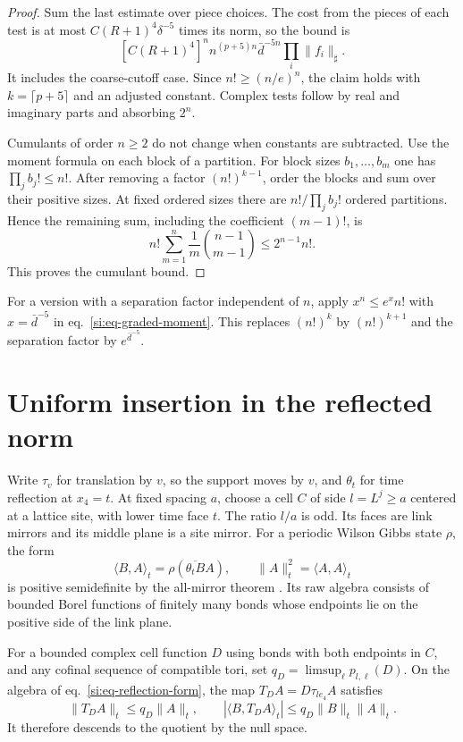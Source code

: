 \documentclass[11pt,letterpaper,reqno]{amsart}
\makeatletter
\numberwithin{equation}{section}
\renewcommand{\eqref}[1]{\textup{eq.~\ref{#1}}}
\theoremstyle{definition}
\newcommand{\ms@minorstart}{%
  \pushQED{\qed}\renewcommand{\qedsymbol}{$\blacksquare$}}
\newenvironment{lemma}[1][]{\ms@minorstart\ms@lemma[#1]}
  {\popQED\endms@lemma}
\theoremstyle{remark}
\makeatother
\begin{document}
\begin{proof}
Sum the last estimate over piece choices. The cost from the
pieces of each test is at most $C(R+1)^4\delta^{-5}$ times
its norm, so the bound is
\[
   [C(R+1)^4]^n n^{(p+5)n}\bar d^{-5n}\prod_i\|f_i\|_\sharp .
\]
It includes the coarse-cutoff case. Since $n!\ge(n/e)^n$, the
claim holds with $k=\lceil p+5\rceil$ and an adjusted constant.
Complex tests follow by real and imaginary parts and absorbing
$2^n$.

Cumulants of order $n\ge2$ do not change when constants are
subtracted. Use the moment formula on each block of a partition.
For block sizes $b_1,\ldots,b_m$ one has $\prod_j b_j!\le n!$.
After removing a factor $(n!)^{k-1}$, order the blocks and
sum over their positive sizes. At fixed ordered sizes there
are $n!/\prod_j b_j!$ ordered partitions. Hence the remaining
sum, including the coefficient $(m-1)!$, is
\[
    n!\sum_{m=1}^n \frac1m \binom{n-1}{m-1}\le 2^{n-1}n!.
\]
This proves the cumulant bound.
\end{proof}

For a version with a separation factor independent of $n$,
apply $x^n\le e^x n!$ with $x=\bar d^{-5}$ in
\eqref{si:eq-graded-moment}. This replaces $(n!)^k$ by
$(n!)^{k+1}$ and the separation factor by $e^{\bar d^{-5}}$.


\section{Uniform insertion in the reflected norm}
\label{si:sec-insertion}

Write $\tau_v$ for translation by $v$, so the support moves by
$v$, and $\theta_t$ for time reflection at $x_4=t$. At fixed
spacing $a$, choose a cell $C$ of side $l=L^j\ge a$ centered at
a lattice site, with lower time face $t$. The ratio $l/a$ is
odd. Its faces are link mirrors and its middle plane is a site
mirror. For a periodic Wilson Gibbs state $\rho$, the form
\begin{equation}\label{si:eq-reflection-form}
  \langle B,A\rangle_t=\rho(\overline{\theta_t B}A),
  \qquad \|A\|_t^2=\langle A,A\rangle_t
\end{equation}
is positive semidefinite by the all-mirror theorem
\cite[Theorem~B]{LP}. Its raw algebra consists of bounded
Borel functions of finitely many bonds whose endpoints lie
on the positive side of the link plane.

\begin{samepage}
\begin{lemma}[Cell multiplication and a time shift]
\label{si:lem-reflected-cell-operator}
For a bounded complex cell function $D$ using bonds with both
endpoints in $C$, and any cofinal sequence of compatible tori,
set $q_D=\limsup_{\ell}p_{l,\ell}(D)$. On the algebra of
\eqref{si:eq-reflection-form}, the map $T_D A=D\tau_{le_4}A$
satisfies
\begin{equation}\label{si:eq-cell-operator}
 \|T_D A\|_t\le q_D\|A\|_t,\qquad
 |\langle B,T_D A\rangle_t|\le q_D\|B\|_t\|A\|_t .
\end{equation}
It therefore descends to the quotient by the null space.
\end{lemma}
\end{samepage}
\end{document}
